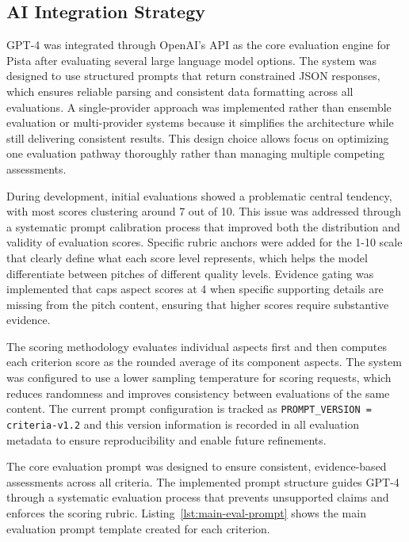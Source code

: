 \subsection{AI Integration Strategy}\label{subsec:ai-integration-strategy}
GPT-4 was integrated through OpenAI's API as the core evaluation engine for Pista after evaluating several large language model options. The system was designed to use structured prompts that return constrained JSON responses, which ensures reliable parsing and consistent data formatting across all evaluations. A single-provider approach was implemented rather than ensemble evaluation or multi-provider systems because it simplifies the architecture while still delivering consistent results. This design choice allows focus on optimizing one evaluation pathway thoroughly rather than managing multiple competing assessments.

During development, initial evaluations showed a problematic central tendency, with most scores clustering around 7 out of 10. This issue was addressed through a systematic prompt calibration process that improved both the distribution and validity of evaluation scores. Specific rubric anchors were added for the 1-10 scale that clearly define what each score level represents, which helps the model differentiate between pitches of different quality levels. Evidence gating was implemented that caps aspect scores at 4 when specific supporting details are missing from the pitch content, ensuring that higher scores require substantive evidence.

The scoring methodology evaluates individual aspects first and then computes each criterion score as the rounded average of its component aspects. The system was configured to use a lower sampling temperature for scoring requests, which reduces randomness and improves consistency between evaluations of the same content. The current prompt configuration is tracked as \texttt{PROMPT\_VERSION = criteria\textrm{-}v1.2} and this version information is recorded in all evaluation metadata to ensure reproducibility and enable future refinements.

The core evaluation prompt was designed to ensure consistent, evidence-based assessments across all criteria. The implemented prompt structure guides GPT-4 through a systematic evaluation process that prevents unsupported claims and enforces the scoring rubric. Listing~\ref{lst:main-eval-prompt} shows the main evaluation prompt template created for each criterion.


